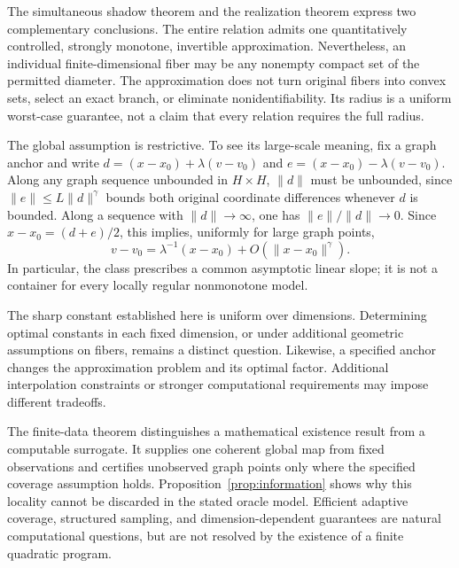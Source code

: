 \documentclass[11pt]{article}
\numberwithin{equation}{section}
\theoremstyle{definition}
\theoremstyle{remark}
\newcommand{\norm}[1]{\lVert #1\rVert}
\begin{document}
The simultaneous shadow theorem and the realization theorem express
two complementary conclusions. The entire relation admits one
quantitatively controlled, strongly monotone, invertible approximation.
Nevertheless, an individual finite-dimensional fiber may be any
nonempty compact set of the permitted diameter. The approximation
does not turn original fibers into convex sets, select an exact branch,
or eliminate nonidentifiability. Its radius is a uniform worst-case
guarantee, not a claim that every relation requires the full radius.

The global assumption is restrictive. To see its large-scale meaning,
fix a graph anchor and write $d=(x-x_0)+\lambda(v-v_0)$ and
$e=(x-x_0)-\lambda(v-v_0)$. Along any graph sequence unbounded in
$H\times H$, $\norm d$ must be unbounded, since
$\norm e\le L\norm d^\gamma$ bounds both original coordinate
differences whenever $d$ is bounded. Along a sequence with
$\norm d\to\infty$, one has $\norm e/\norm d\to0$.
Since $x-x_0=(d+e)/2$, this implies, uniformly for large graph points,
\[
 v-v_0=\lambda^{-1}(x-x_0)+O(\norm{x-x_0}^\gamma).
\]
In particular, the class prescribes a common asymptotic linear slope;
it is not a container for every locally regular nonmonotone model.

The sharp constant established here is uniform over dimensions.
Determining optimal constants in each fixed dimension, or under
additional geometric assumptions on fibers, remains a distinct
question. Likewise, a specified anchor changes the approximation
problem and its optimal factor. Additional interpolation constraints
or stronger computational requirements may impose different tradeoffs.

The finite-data theorem distinguishes a mathematical existence result
from a computable surrogate. It supplies one coherent global map from
fixed observations and certifies unobserved graph points only where
the specified coverage assumption holds. Proposition~\ref{prop:information}
shows why this locality cannot be discarded in the stated oracle
model. Efficient adaptive coverage, structured sampling, and
dimension-dependent guarantees are natural computational questions,
but are not resolved by the existence of a finite quadratic program.
\end{document}
